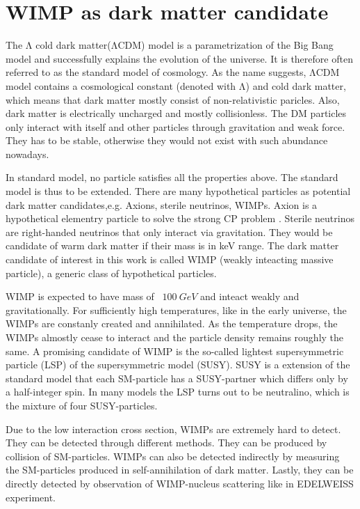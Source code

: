 \section{WIMP as dark matter candidate}
The $\mathrm{\Lambda}$ cold dark matter($\mathrm{\Lambda}$CDM) model is a parametrization of the Big Bang model and successfully explains the evolution of the universe. It is therefore often referred to as the standard model of cosmology. As the name suggests, $\mathrm{\Lambda}$CDM model contains a cosmological constant (denoted with $\mathrm{\Lambda}$) and cold dark matter, which means that dark matter mostly consist of non-relativistic paricles. Also, dark matter is electrically uncharged and mostly collisionless. The DM particles only interact with itself and other particles through gravitation and weak force. They has to be stable, otherwise they would not exist with such abundance nowadays.

In standard model, no particle satisfies all the properties above. The standard model is thus to be extended. There are many hypothetical particles as potential dark matter candidates,e.g. Axions, sterile neutrinos, WIMPs. Axion is a hypothetical elementry particle to solve the strong CP problem \cite{Pec77}. Sterile neutrinos are right-handed neutrinos that only interact via gravitation. They would be candidate of warm dark matter if their mass is in keV range. The dark matter candidate of interest in this work is called WIMP (weakly inteacting massive particle), a generic class of hypothetical particles.

WIMP is expected to have mass of ~$\SI{100}{GeV}$ and inteact weakly and gravitationally.  For sufficiently high temperatures, like in the early universe, the WIMPs are constanly created and annihilated. As the temperature drops, the WIMPs almostly cease to interact and the particle density remains roughly the same. A promising candidate of WIMP is the so-called lightest supersymmetric particle (LSP) of the supersymmetric model (SUSY). SUSY is a extension of the standard model that each SM-particle has a SUSY-partner which differs only by a half-integer spin. In many models the LSP turns out to be neutralino, which is the mixture of four SUSY-particles.

Due to the low interaction cross section, WIMPs are extremely hard to detect. They can be detected through different methods. They can be produced by collision of SM-particles. WIMPs can also be detected indirectly by measuring the SM-particles produced in self-annihilation of dark matter. Lastly, they can be directly detected by observation of WIMP-nucleus scattering like in EDELWEISS experiment.

